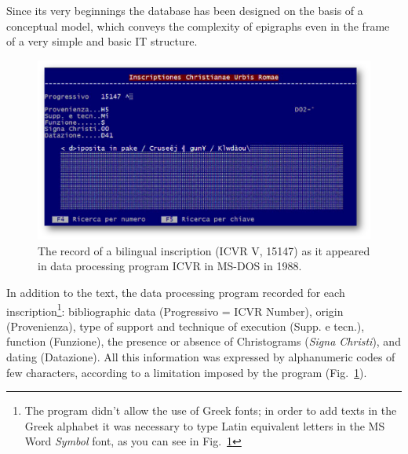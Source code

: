 \documentclass[amsthm,ebook]{saparticle}
\begin{document}
Since its very beginnings the database has been designed on the basis of a conceptual model, which conveys the
complexity of epigraphs even in the frame of a very simple and basic IT structure.



\begin{figure}[hbp]
\centering
 \includegraphics[width=\columnwidth]{EAGLE2016Roccoengrev-img001.png} 
\caption{The record of a bilingual inscription (ICVR V, 15147) as it appeared in data processing program ICVR in MS-DOS
in 1988.}
\label{fig:1}
\end{figure}




In addition to the text, the data processing program recorded for each inscription\footnote{ The program didn’t allow
the use of Greek fonts; in order to add texts in the Greek alphabet it was necessary to type Latin equivalent letters
in the MS Word \emph{Symbol} font, as you can see in Fig.~\ref{fig:1}}: bibliographic data (Progressivo = ICVR Number), origin
(Provenienza), type of support and technique of execution (Supp. e tecn.), function (Funzione), the presence or
absence of Christograms (\emph{Signa Christi}), and dating (Datazione). All this information was expressed by alphanumeric
codes of few characters, according to a limitation imposed by the program (Fig.~\ref{fig:1}).
\end{document}
